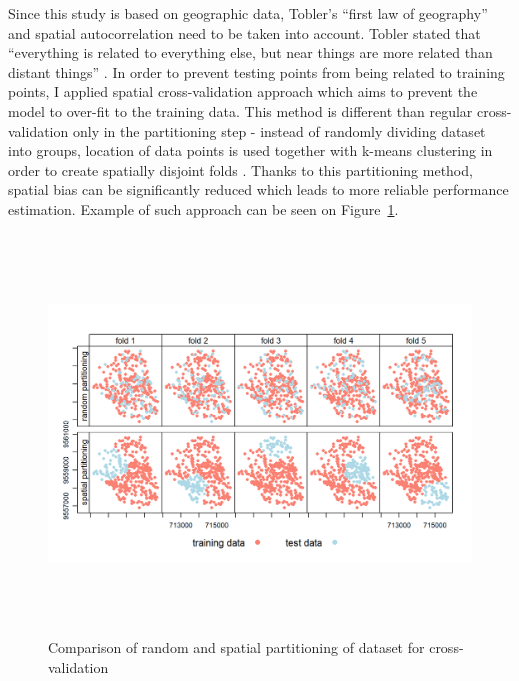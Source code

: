 \documentclass{amuthesis}
\begin{document}
Since this study is based on geographic data, Tobler's ``first law of
geography'' and spatial autocorrelation need to be taken into account.
Tobler stated that ``everything is related to everything else, but near
things are more related than distant things''
\autocite{tobler_computer_1970}. In order to prevent testing points from
being related to training points, I applied spatial cross-validation
approach which aims to prevent the model to over-fit to the training
data. This method is different than regular cross-validation only in the
partitioning step - instead of randomly dividing dataset into groups,
location of data points is used together with k-means clustering
\autocite{brenning_spatial_2012} in order to create spatially disjoint
folds \autocite{lovelace_geocomputation_2019}. Thanks to this
partitioning method, spatial bias can be significantly reduced which
leads to more reliable performance estimation. Example of such approach
can be seen on Figure~\ref{fig-rycina7}.

\begin{figure}[t]

{\centering \includegraphics[width=1\textwidth,height=4.16667in]{./figures/spatial_partitioning.png}

}

\caption{\label{fig-rycina7}Comparison of random and spatial
partitioning of dataset for cross-validation
\autocite{lovelace_geocomputation_2019}}

\end{figure}
\end{document}
